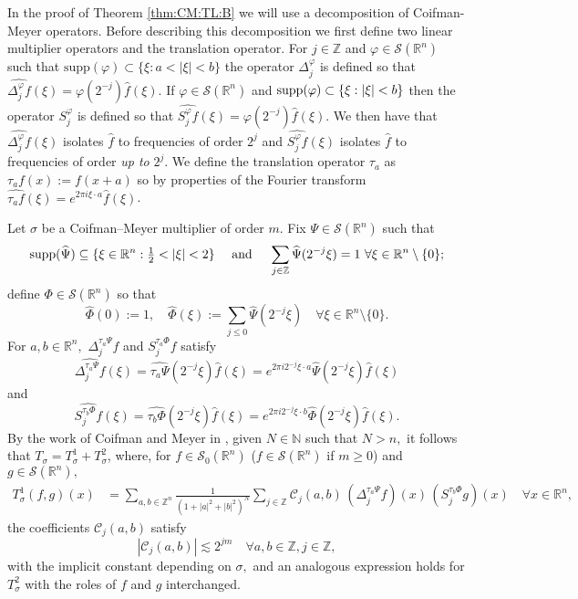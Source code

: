 \documentclass[10pt,a4paper]{article}
\theoremstyle{remark}
\newcommand{\na}{\mathbb{N}}
\newcommand{\ent}{\mathbb{Z}}
\newcommand{\rn}{{{\mathbb R}^n}}
\newcommand{\sw}{{\mathcal{S}}(\rn)}
\newcommand{\swz}{{\mathcal{S}_0}(\rn)}
\newcommand{\C}{\mathcal{C}}
\newcommand{\Do}[2]{\Delta^{#1}_{#2}}
\newcommand{\So}[2]{S^{#1}_{#2}}
\newcommand{\abs}[1]{\left\vert #1 \right\vert}
\newcommand{\fr}[2]{{\textstyle \frac{#1}{#2}}}
\newcommand{\supp}{{\rm{supp}}}
\begin{document}
In the proof of Theorem \ref{thm:CM:TL:B} we will use a decomposition of Coifman-Meyer operators. Before describing this decomposition we first define two linear multiplier operators and the translation operator.
For $j\in\mathbb{Z}$ and $\varphi \in \sw$ such that $\text{supp}(\varphi) \subset \{\xi : a < |\xi| < b \}$ the operator $\Delta^\varphi_j$ is defined so that $\widehat{\Delta^\varphi_j f}(\xi) = \varphi(2^{-j})\widehat{f}(\xi)$. 
If $\varphi \in \sw$ and $\text{\supp}(\varphi) \subset \{ \xi : |\xi| < b \}$ then the operator $S^\varphi_j$ is defined so that $\widehat{S^\varphi_j f}(\xi) = \varphi(2^{-j})\widehat{f}(\xi)$.
We then have that $\widehat{\Delta^\varphi_j f}(\xi)$ isolates $\widehat{f}$ to frequencies of order $2^j$ and $\widehat{S^\varphi_j f}(\xi)$ isolates $\widehat{f}$ to frequencies of order \textit{up to} $2^j$. 
We define the translation operator $\tau_a$ as $\tau_a f(x) := f(x+a)$ so by properties of the Fourier transform $\widehat{\tau_a f}(\xi) = e^{2\pi i \xi \cdot a} \widehat{f}(\xi)$.

Let $\sigma$ be a Coifman--Meyer multiplier of order $m.$
Fix $\Psi \in \sw$ such that 
$$
\supp(\widehat{\Psi}) \subseteq \{ \xi \in \rn : \fr{1}{2} < |\xi| < 2 \} \quad\text{ and }\quad
\sum_{j\in\ent} \widehat{\Psi}(2^{-j}\xi) = 1 \,\,\forall \xi \in \rn \setminus \{ 0 \};
$$
define $\Phi \in \sw$ so that
$$
\widehat{\Phi}(0) := 1,\quad \widehat{\Phi}(\xi) := \sum_{j \le 0} \widehat{\Psi}(2^{-j}\xi)\quad \forall \xi \in \rn \setminus \{0\}.$$
For $a,b\in\rn,$ $\Do{\tau_a \Psi }{j} f$ and  $\So{ \tau_a \Phi }{j} f$ satisfy 
$$\widehat{\Do{\tau_a \Psi }{j} f}(\xi)=\widehat{\tau_a\Psi}(2^{-j}\xi)\widehat{f}(\xi)=e^{2\pi i 2^{-j}\xi\cdot a} \widehat{\Psi}(2^{-j}\xi)\widehat{f}(\xi)$$
 and   
 $$\widehat{\So{\tau_b \Phi }{j} f}(\xi)=\widehat{\tau_b\Phi}(2^{-j}\xi)\widehat{f}(\xi)=e^{2\pi i 2^{-j}\xi\cdot b} \widehat{\Phi}(2^{-j}\xi)\widehat{f}(\xi).$$
By the work of Coifman and Meyer in \cite{MR518170},  given $N\in \na$ such that $N>n,$ it follows that $T_\sigma= T_\sigma^1 + T_\sigma^2$, where, for  $f\in \swz$ ($f\in \sw$ if $m\ge 0$) and $g\in\sw,$
\begin{align}\label{eq:decompT1}
T_\sigma^1(f,g)(x) &= \sum_{a,b\in \ent^n} \frac{1}{(1+|a|^2+|b|^2)^N} \sum_{j\in\ent} \C_j(a,b) \,(\Do{ \tau_a \Psi }{j} f)(x)\, (\So{ \tau_b \Phi }{j} g )(x)\quad \forall x\in \rn,
\end{align}
 the coefficients $\C_j(a,b)$   satisfy
\begin{equation}\label{eq:cjbound}
\abs{\C_j(a,b)}\lesssim 2^{jm}\quad \forall a,b\in\ent, j\in \ent,
\end{equation}
with the implicit constant depending on $\sigma,$ and an analogous expression holds for $T_\sigma^2$ with the roles of $f$ and $g$ interchanged. 
\end{document}

